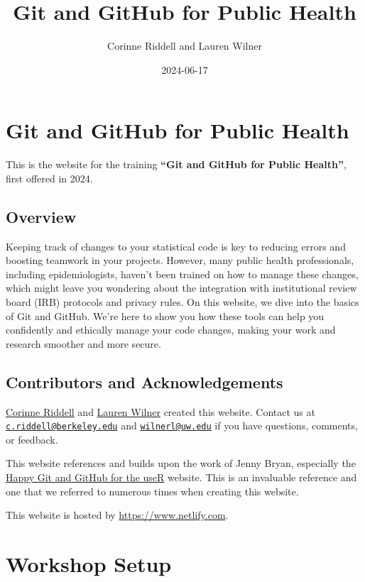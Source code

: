 \documentclass[
]{book}
\title{Git and GitHub for Public Health}
\author{Corinne Riddell and Lauren Wilner}
\date{2024-06-17}
\begin{document}
\maketitle

{
\setcounter{tocdepth}{1}
\tableofcontents
}
\chapter{Git and GitHub for Public Health}\label{git-and-github-for-public-health}

This is the website for the training \textbf{``Git and GitHub for Public Health''},
first offered in 2024.

\section{Overview}\label{overview}

Keeping track of changes to your statistical code is key to reducing errors and boosting teamwork in your projects. However, many public health professionals, including epidemiologists, haven't been trained on how to manage these changes, which might leave you wondering about the integration with institutional review board (IRB) protocols and privacy rules. On this website, we dive into the basics of Git and GitHub. We're here to show you how these tools can help you confidently and ethically manage your code changes, making your work and research smoother and more secure.

\section{Contributors and Acknowledgements}\label{contributors-and-acknowledgements}

\href{https://corinne-riddell.github.io/}{Corinne Riddell} and \href{laurenwilner.github.io}{Lauren Wilner}
created this website. Contact us at \href{mailto:c.riddell@berkeley.edu}{\nolinkurl{c.riddell@berkeley.edu}} and \href{mailto:wilnerl@uw.edu}{\nolinkurl{wilnerl@uw.edu}} if
you have questions, comments, or feedback.

This website references and builds upon the work of Jenny Bryan, especially the
\href{https://happygitwithr.com/}{Happy Git and GitHub for the useR} website. This is
an invaluable reference and one that we referred to numerous times when creating
this website.

This website is hosted by \url{https://www.netlify.com}.

\chapter{Workshop Setup}\label{workshop-setup}
\end{document}
